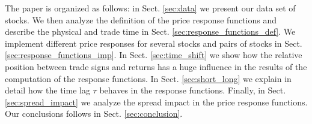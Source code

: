 The paper is organized as follows: in Sect. \ref{sec:data} we present our data
set of stocks. We then analyze the definition of the price response functions
and describe the physical and trade time in Sect.
\ref{sec:response_functions_def}. We implement different price responses for
several stocks and pairs of stocks in Sect. \ref{sec:response_functions_imp}.
In Sect. \ref{sec:time_shift} we show how the relative position between trade
signs and returns has a huge influence in the results of the computation of the
response functions. In Sect. \ref{sec:short_long} we explain in detail how the
time lag $\tau$ behaves in the response functions. Finally, in Sect.
\ref{sec:spread_impact} we analyze the spread impact in the price response
functions. Our conclusions follows in Sect. \ref{sec:conclusion}.